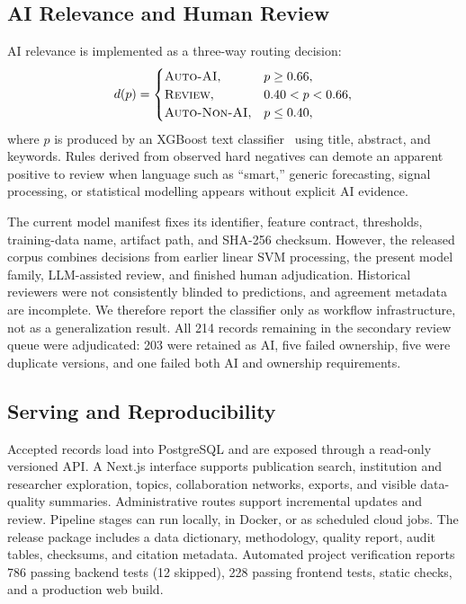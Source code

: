 \documentclass[conference]{IEEEtran}
\begin{document}
\subsection{AI Relevance and Human Review}
AI relevance is implemented as a three-way routing decision:
\begin{equation}
d(p)=\begin{cases}
\textsc{Auto-AI}, & p\geq 0.66,\\
\textsc{Review}, & 0.40<p<0.66,\\
\textsc{Auto-Non-AI}, & p\leq 0.40,
\end{cases}
\end{equation}
where $p$ is produced by an XGBoost text classifier~\cite{chen2016xgboost} using title, abstract, and keywords. Rules derived from observed hard negatives can demote an apparent positive to review when language such as ``smart,'' generic forecasting, signal processing, or statistical modelling appears without explicit AI evidence.

The current model manifest fixes its identifier, feature contract, thresholds, training-data name, artifact path, and SHA-256 checksum. However, the released corpus combines decisions from earlier linear SVM processing, the present model family, LLM-assisted review, and finished human adjudication. Historical reviewers were not consistently blinded to predictions, and agreement metadata are incomplete. We therefore report the classifier only as workflow infrastructure, not as a generalization result. All 214 records remaining in the secondary review queue were adjudicated: 203 were retained as AI, five failed ownership, five were duplicate versions, and one failed both AI and ownership requirements.

\subsection{Serving and Reproducibility}
Accepted records load into PostgreSQL and are exposed through a read-only versioned API. A Next.js interface supports publication search, institution and researcher exploration, topics, collaboration networks, exports, and visible data-quality summaries. Administrative routes support incremental updates and review. Pipeline stages can run locally, in Docker, or as scheduled cloud jobs. The release package includes a data dictionary, methodology, quality report, audit tables, checksums, and citation metadata. Automated project verification reports 786 passing backend tests (12 skipped), 228 passing frontend tests, static checks, and a production web build.
\end{document}
